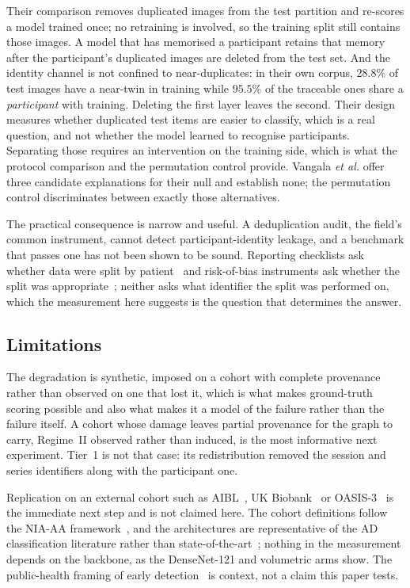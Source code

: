 \documentclass[pdflatex,sn-vancouver-num]{sn-jnl}
\newcommand{\etal}{\textit{et al.}}
\begin{document}
Their comparison removes duplicated images from the test partition and re-scores
a model trained once; no retraining is involved, so the training split still
contains those images. A model that has memorised a participant retains that
memory after the participant's duplicated images are deleted from the test set.
And the identity channel is not confined to near-duplicates: in their own
corpus, $28.8\%$ of test images have a near-twin in training while $95.5\%$ of
the traceable ones share a \emph{participant} with training. Deleting the first
layer leaves the second. Their design measures whether duplicated test items are
easier to classify, which is a real question, and not whether the model learned
to recognise participants. Separating those requires an intervention on the
training side, which is what the protocol comparison and the permutation control
provide. Vangala \etal{} offer three candidate explanations for their null and
establish none; the permutation control discriminates between exactly those
alternatives.

The practical consequence is narrow and useful. A deduplication audit, the
field's common instrument, cannot detect participant-identity leakage, and a
benchmark that passes one has not been shown to be sound. Reporting checklists
ask whether data were split by patient~\cite{mongan2020claim,tripod2024} and
risk-of-bias instruments ask whether the split was appropriate~\cite{wolff2019probast};
neither asks what identifier the split was performed on, which the measurement
here suggests is the question that determines the answer.

\subsection{Limitations}
\label{sec:limitations}

The degradation is synthetic, imposed on a cohort with complete provenance
rather than observed on one that lost it, which is what makes ground-truth
scoring possible and also what makes it a model of the failure rather than the
failure itself. A cohort whose damage leaves partial provenance for the graph to
carry, Regime~II observed rather than induced, is the most informative next
experiment. Tier~1 is not that case: its redistribution removed the session and
series identifiers along with the participant one.

Replication on an external cohort such as
AIBL~\cite{ellis2009aibl}, UK Biobank~\cite{sudlow2015ukbiobank} or
OASIS-3~\cite{lamontagne2019oasis3} is the immediate next step and is not
claimed here. The cohort definitions follow the NIA-AA
framework~\cite{jack2011,jack2018niaaa}, and the architectures are
representative of the AD classification literature rather than
state-of-the-art~\cite{korolev2017residual,lian2020hierarchical,qiu2020explainable,liem2017brainage};
nothing in the measurement depends on the backbone, as the DenseNet-121 and
volumetric arms show. The public-health framing of early
detection~\cite{who2023} is context, not a claim this paper tests.
\end{document}

